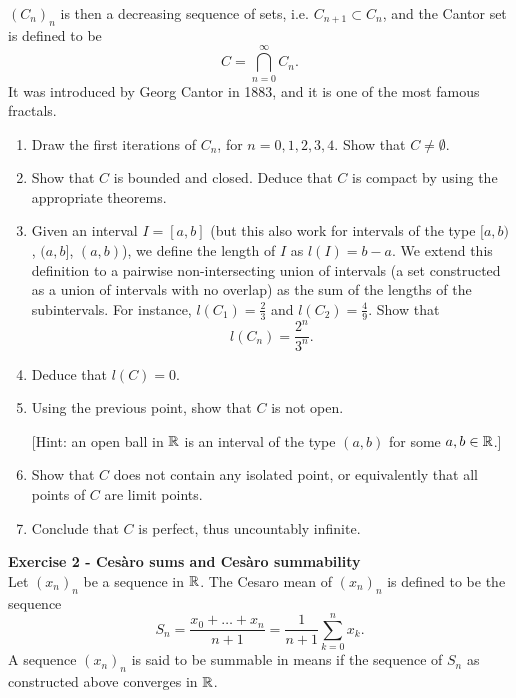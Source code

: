 \documentclass[12pt,a4paper]{article}
\begin{document}
$(C_n)_n$ is then a decreasing sequence of sets, i.e. $C_{n+1}\subset C_n$, and the Cantor set is defined to be
$$C=\bigcap_{n=0}^\infty C_n.$$
It was introduced by Georg Cantor in 1883, and it is one of the most famous fractals.
\begin{enumerate}
\item Draw the first iterations of $C_n$, for $n=0,1,2,3,4$. Show that $C\neq \emptyset$.
\item Show that $C$ is bounded and closed. Deduce that $C$ is compact by using the appropriate theorems.
\item Given an interval $I=[a,b]$ (but this also work for intervals of the type $[a,b)$, $(a,b]$, $(a,b)$), we define the length of $I$ as $l(I)=b-a$. We extend this definition to a pairwise non-intersecting union of intervals (a set constructed as a union of intervals with no overlap) as the sum of the lengths of the subintervals. For instance, $l(C_1)=\frac{2}{3}$ and $l(C_2)=\frac{4}{9}$.
Show that
$$l(C_n)=\frac{2^{n}}{3^n}.$$
\item
Deduce that $l(C)=0$.
\item Using the previous point, show that $C$ is not open. 

[Hint: an open ball in $\mathbb{R}$ is an interval of the type $(a,b)$ for some $a,b\in\mathbb{R}$.]
\item Show that $C$ does not contain any isolated point, or equivalently that all points of $C$ are limit points.
\item Conclude that $C$ is perfect, thus uncountably infinite.
\end{enumerate}


\solution{

}






\bigskip



\textbf{Exercise 2 - Cesàro sums and Cesàro summability}\\
Let $(x_n)_n$ be a sequence in $\mathbb{R}$. The Cesaro mean of $(x_n)_n$ is defined to be the sequence
$$S_n=\frac{x_0+\dots+x_n}{n+1}=\frac{1}{n+1} \sum_{k=0}^{n} x_k.$$
A sequence $(x_n)_n$ is said to be summable in means if the sequence of $S_n$ as constructed above converges in $\mathbb{R}$.
\end{document}
